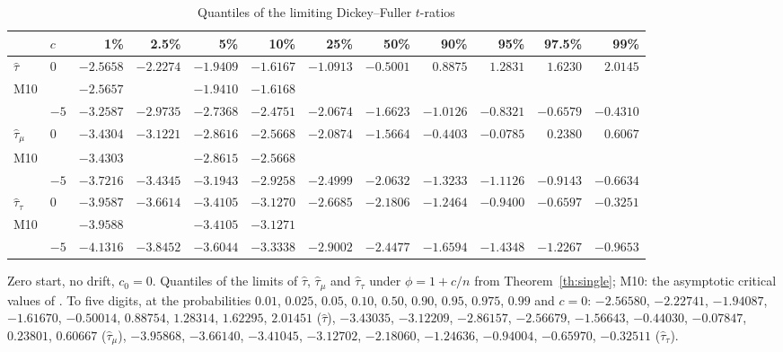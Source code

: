 \documentclass[ecta,nameyear,final]{econsocart}
\theoremstyle{plain}
\theoremstyle{definition}
\begin{document}
\begin{table}[tbp]
\caption{Quantiles of the limiting Dickey--Fuller $t$-ratios}
\label{tab:quant}
\begin{center}
\scriptsize
\setlength{\tabcolsep}{1.8pt}
\begin{tabular}{llrrrrrrrrrr}
\toprule
 & $c$ & 1\% & 2.5\% & 5\% & 10\% & 25\% & 50\% & 90\% & 95\% & 97.5\% & 99\%\\
\midrule
$\hat\tau$ & $0$ & $-2.5658$ & $-2.2274$ & $-1.9409$ & $-1.6167$ & $-1.0913$ & $-0.5001$ & $0.8875$ & $1.2831$ & $1.6230$ & $2.0145$\\
\quad M10 & & $-2.5657$ & & $-1.9410$ & $-1.6168$ & & & & & & \\
 & $-5$ & $-3.2587$ & $-2.9735$ & $-2.7368$ & $-2.4751$ & $-2.0674$ & $-1.6623$ & $-1.0126$ & $-0.8321$ & $-0.6579$ & $-0.4310$\\
$\hat\tau_\mu$ & $0$ & $-3.4304$ & $-3.1221$ & $-2.8616$ & $-2.5668$ & $-2.0874$ & $-1.5664$ & $-0.4403$ & $-0.0785$ & $0.2380$ & $0.6067$\\
\quad M10 & & $-3.4303$ & & $-2.8615$ & $-2.5668$ & & & & & & \\
 & $-5$ & $-3.7216$ & $-3.4345$ & $-3.1943$ & $-2.9258$ & $-2.4999$ & $-2.0632$ & $-1.3233$ & $-1.1126$ & $-0.9143$ & $-0.6634$\\
$\hat\tau_\tau$ & $0$ & $-3.9587$ & $-3.6614$ & $-3.4105$ & $-3.1270$ & $-2.6685$ & $-2.1806$ & $-1.2464$ & $-0.9400$ & $-0.6597$ & $-0.3251$\\
\quad M10 & & $-3.9588$ & & $-3.4105$ & $-3.1271$ & & & & & & \\
 & $-5$ & $-4.1316$ & $-3.8452$ & $-3.6044$ & $-3.3338$ & $-2.9002$ & $-2.4477$ & $-1.6594$ & $-1.4348$ & $-1.2267$ & $-0.9653$\\
\bottomrule
\end{tabular}
\end{center}
{\small Zero start, no drift, $c_0=0$.  Quantiles of the limits of $\hat\tau$, $\hat\tau_\mu$ and $\hat\tau_\tau$ under $\phi=1+c/n$ from Theorem~\ref{th:single}; M10: the asymptotic critical values of \cite{MacKinnon2010}.  To five digits, at the probabilities $0.01$, $0.025$, $0.05$, $0.10$, $0.50$, $0.90$, $0.95$, $0.975$, $0.99$ and $c=0$:
$-2.56580$, $-2.22741$, $-1.94087$, $-1.61670$, $-0.50014$, $0.88754$, $1.28314$, $1.62295$, $2.01451$ ($\hat\tau$),
$-3.43035$, $-3.12209$, $-2.86157$, $-2.56679$, $-1.56643$, $-0.44030$, $-0.07847$, $0.23801$, $0.60667$ ($\hat\tau_\mu$),
$-3.95868$, $-3.66140$, $-3.41045$, $-3.12702$, $-2.18060$, $-1.24636$, $-0.94004$, $-0.65970$, $-0.32511$ ($\hat\tau_\tau$).}
\end{table}
\end{document}
